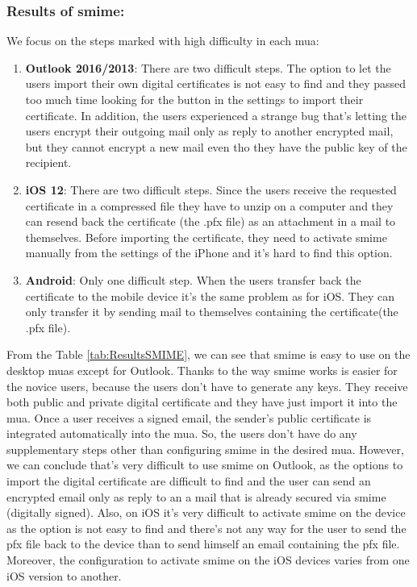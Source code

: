 \subsubsection{Results of \acrshort{smime}:}
We focus on the steps marked with high difficulty in each \acrshort{mua}:
\begin{enumerate}
	\item \textbf{Outlook 2016/2013}: There are two difficult steps. The option to let the users import their own digital certificates is not easy to find and they passed too much time looking for the button in the settings to import their certificate. In addition, the users experienced a strange bug that's letting the users encrypt their outgoing mail only as reply to another encrypted mail, but they cannot encrypt a new mail even tho they have the public key of the recipient.
	\item \textbf{iOS 12}: There are two difficult steps. Since the users receive the requested certificate in a compressed file they have to unzip on a computer and they can resend back the certificate (the .pfx file) as an attachment in a mail to themselves. Before importing the certificate, they need to activate \acrshort{smime} manually from the settings of the iPhone and it's hard to find this option.
	\item \textbf{Android}: Only one difficult step. When the users transfer back the certificate to the mobile device it's the same problem as for iOS. They can only transfer it by sending mail to themselves containing the certificate(the .pfx file).
\end{enumerate}
From the Table \ref{tab:ResultsSMIME}, we can see that \acrshort{smime} is easy to use on the desktop \acrshort{mua}s except for Outlook. Thanks to the way \acrshort{smime} works is easier for the novice users, because the users don't have to generate any keys. They receive both public and private digital certificate and they have just import it into the \acrshort{mua}. Once a user receives a signed email, the sender's public certificate is integrated automatically into the \acrshort{mua}. So, the users don't have do any supplementary steps other than configuring \acrshort{smime} in the desired \acrshort{mua}. However, we can conclude that's very difficult to use \acrshort{smime} on Outlook, as the options to import the digital certificate are difficult to find and the user can send an encrypted email only as reply to an a mail that is already secured via \acrshort{smime} (digitally signed). Also, on iOS it's very difficult to activate \acrshort{smime} on the device as the option is not easy to find and there's not any way for the user to send the pfx file back to the device than to send himself an email containing the pfx file. Moreover, the configuration to activate \acrshort{smime} on the iOS devices varies from one iOS version to another.

